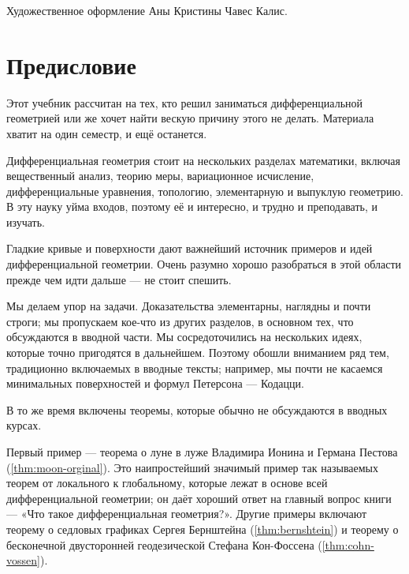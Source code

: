Художественное оформление Аны Кристины Чавес Калис.
\null
\vfill
{}


\thispagestyle{empty}
\newpage

\chapter*{Предисловие}
\thispagestyle{myheadings}

Этот учебник рассчитан на тех, кто решил заниматься дифференциальной геометрией или же хочет найти вескую причину этого не делать.
Материала хватит на один семестр, и ещё останется.

Дифференциальная геометрия стоит на нескольких разделах математики, включая
вещественный анализ,
теорию меры,
вариационное исчисление,
дифференциальные уравнения, топологию, элементарную и выпуклую геометрию.
В эту науку уйма входов, поэтому её и интересно, и трудно и преподавать, и изучать.

Гладкие кривые и поверхности дают важнейший источник примеров и идей дифференциальной геометрии.
Очень разумно хорошо разобраться в этой области прежде чем идти дальше --- не стоит спешить.

Мы делаем упор на задачи.
Доказательства элементарны, наглядны и почти строги;
мы пропускаем кое-что из других разделов, в основном тех, что обсуждаются в вводной части.
Мы сосредоточились на нескольких идеях, которые точно пригодятся в дальнейшем.
Поэтому обошли вниманием ряд тем, традиционно включаемых в вводные тексты;
например, мы почти не касаемся минимальных поверхностей и формул Петерсона --- Кодацци.

В то же время включены теоремы, которые обычно не обсуждаются в вводных курсах.

Первый пример --- теорема о луне в луже Владимира Ионина и Германа Пестова (\ref{thm:moon-orginal}).
Это наипростейший значимый пример так называемых теорем от локального к глобальному, которые лежат в основе всей дифференциальной геометрии;
он даёт хороший ответ на главный вопрос книги --- «Что такое дифференциальная геометрия?».
Другие примеры включают теорему о седловых графиках Сергея Бернштейна (\ref{thm:bernshtein}) и теорему о бесконечной двусторонней геодезической Стефана Кон-Фоссена (\ref{thm:cohn-vossen}).

